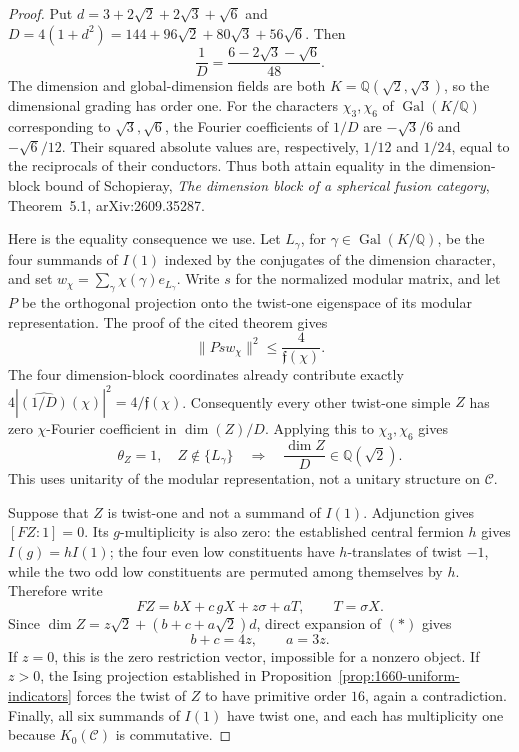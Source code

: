 \begin{proof}
Put $d=3+2\sqrt2+2\sqrt3+\sqrt6$ and
$D=4(1+d^2)=144+96\sqrt2+80\sqrt3+56\sqrt6$. Then
\[
 \frac1D=\frac{6-2\sqrt3-\sqrt6}{48}.
\]
The dimension and global-dimension fields are both
$K=\mathbb Q(\sqrt2,\sqrt3)$, so the dimensional grading has order one.
For the characters $\chi_3,\chi_6$ of $\operatorname{Gal}(K/\mathbb Q)$
corresponding to $\sqrt3,\sqrt6$, the Fourier coefficients of $1/D$ are
$-\sqrt3/6$ and $-\sqrt6/12$. Their squared absolute values are,
respectively, $1/12$ and $1/24$, equal to the reciprocals of their
conductors. Thus both attain equality in the dimension-block bound
of Schopieray, \emph{The dimension block of a spherical fusion category},
Theorem~5.1, arXiv:2609.35287.

Here is the equality consequence we use. Let $L_\gamma$, for
$\gamma\in\operatorname{Gal}(K/\mathbb Q)$, be the four summands of
$I(1)$ indexed by the conjugates of the dimension character, and set
$w_\chi=\sum_\gamma\chi(\gamma)e_{L_\gamma}$. Write $s$ for the normalized modular matrix, and let $P$ be the orthogonal
projection onto the twist-one eigenspace of its modular representation. The proof of the cited theorem gives
\[
 \|Psw_\chi\|^2\leq\frac{4}{\mathfrak f(\chi)}.
\]
The four dimension-block coordinates already contribute exactly
$4|\widehat{(1/D)}(\chi)|^2=4/\mathfrak f(\chi)$.
Consequently every other twist-one simple $Z$ has zero $\chi$-Fourier
coefficient in $\dim(Z)/D$. Applying this to $\chi_3,\chi_6$ gives
\[
 \theta_Z=1,\quad Z\notin\{L_\gamma\}
 \quad\Longrightarrow\quad \frac{\dim Z}{D}\in\mathbb Q(\sqrt2).
 \tag{*}
\]
This uses unitarity of the modular representation, not a unitary
structure on $\mathcal C$.

Suppose that $Z$ is twist-one and not a summand of $I(1)$.
Adjunction gives $[FZ:1]=0$. Its $g$-multiplicity is also zero:
the established central fermion $h$ gives $I(g)=hI(1)$; the four even
low constituents have $h$-translates of twist $-1$, while the two odd
low constituents are permuted among themselves by $h$.
Therefore write
\[
 FZ=bX+c\,gX+z\sigma+aT,\qquad T=\sigma X.
\]
Since $\dim Z=z\sqrt2+(b+c+a\sqrt2)d$, direct expansion of $(*)$ gives
\[
 b+c=4z,\qquad a=3z.
\]
If $z=0$, this is the zero restriction vector, impossible for a
nonzero object. If $z>0$, the Ising projection established in
Proposition~\ref{prop:1660-uniform-indicators} forces the twist of $Z$
to have primitive order $16$, again a contradiction.
Finally, all six summands of $I(1)$ have twist one, and each has
multiplicity one because $K_0(\mathcal C)$ is commutative.
\end{proof}


